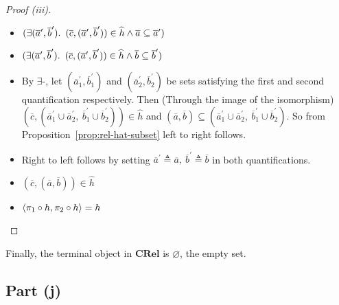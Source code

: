 \begin{prop}
\begin{proof}[Proof (iii)]
\begin{itemize}
      \item[\iffs]
        $(\exists(\overline{a}^\prime,\overline{b}^\prime)\ldotp~(\overline{c},(\overline{a}^\prime,\overline{b}^\prime))\in\widehat{h}\land\overline{a}\subseteq\overline{a}^\prime)$

      \addtolength{\itemsep}{-.4\baselineskip}
      \item[\phantom{\iffs}\llap{$\land$}] $(\exists(\overline{a}^\prime,\overline{b}^\prime)\ldotp~(\overline{c},(\overline{a}^\prime,\overline{b}^\prime))\in\widehat{h}\land\overline{b}\subseteq\overline{b}^\prime)$
      \addtolength{\itemsep}{.4\baselineskip}

      \addtolength{\itemsep}{.5\baselineskip}
      \item[\phantom{\imps}]
        By $\exists$-\Elim, let $(\overline{a}^\prime_1,\overline{b}^\prime_1)$ and $(\overline{a}^\prime_2,\overline{b}^\prime_2)$ be sets satisfying the first and second quantification respectively. Then (Through the image of the isomorphism) ${(\overline{c},(\overline{a}^\prime_1\cup\overline{a}^\prime_2,~\overline{b}^\prime_1\cup\overline{b}^\prime_2))\in\widehat{h}}$ and ${(\overline{a},\overline{b})\subseteq(\overline{a}^\prime_1\cup\overline{a}^\prime_2,~\overline{b}^\prime_1\cup\overline{b}^\prime_2)}$. So from Proposition~\ref{prop:rel-hat-subset} left to right follows.

      \item[\phantom{\imps}]
        Right to left follows by setting $\overline{a}^\prime\triangleq\overline{a},~\overline{b}^\prime\triangleq\overline{b}$ in both quantifications.

      \item[\iffs]
        $(\overline{c},(\overline{a},\overline{b}))\in\widehat{h}$
      \addtolength{\itemsep}{-.5\baselineskip}

      \item[\iffs]
        $\langle\pi_1\circ h,\pi_2\circ h\rangle = h$
        \qedhere
    \end{itemize}
  \end{proof}
\end{prop}

Finally, the terminal object in $\mathbf{CRel}$ is $\varnothing$, the empty set.

\subsection{Part (j)}\label{sec:q-2-j}

